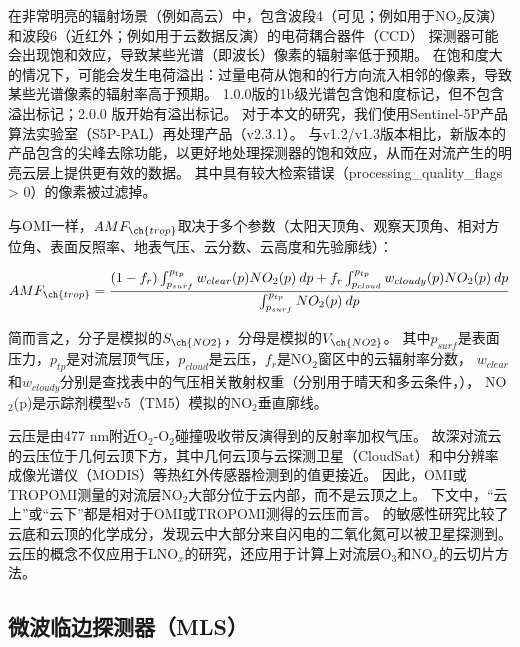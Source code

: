 在非常明亮的辐射场景（例如高云）中，包含波段4（可见；例如用于NO$_2$反演）和波段6（近红外；例如用于云数据反演）的电荷耦合器件（CCD） 探测器可能会出现饱和效应\citep{Ludewig.2020}，导致某些光谱（即波长）像素的辐射率低于预期。
在饱和度大的情况下，可能会发生电荷溢出：过量电荷从饱和的行方向流入相邻的像素，导致某些光谱像素的辐射率高于预期。
1.0.0版的1b级光谱包含饱和度标记，但不包含溢出标记；2.0.0 版开始有溢出标记\citep{Ludewig.2020}。
对于本文的研究，我们使用Sentinel-5P产品算法实验室（S5P-PAL）再处理产品（v2.3.1）。
与v1.2/v1.3版本相比，新版本的产品包含的尖峰去除功能，以更好地处理探测器的饱和效应，从而在对流产生的明亮云层上提供更有效的数据\citep{Ludewig.2020,VanGeffen.2022}。
其中具有较大检索错误（processing\_quality\_flags > 0）的像素被过滤掉。

与OMI一样，$AMF_{\ch{trop}}$取决于多个参数（太阳天顶角、观察天顶角、相对方位角、表面反照率、地表气压、云分数、云高度和先验廓线）：

\begin{equation} \label{eq:AMF_NO2}
AMF_{\ch{trop}} = \frac{(1-f_r) \int_{p_{surf}}^{p_{tp}} w_{clear}(p) NO_2(p) \: dp + f_r \int_{p_{cloud}}^{p_{tp}} w_{cloudy}(p) NO_2(p) \: dp}{\int_{p_{surf}}^{p_{tp}} NO_2(p) \: dp}
\end{equation}

简而言之，分子是模拟的$S_{\ch{NO2}}$，分母是模拟的$V_{\ch{NO2}}$。
其中$p_{surf}$是表面压力，$p_{tp}$是对流层顶气压，$p_{cloud}$是云压，$f_{r}$是NO$_2$窗区中的云辐射率分数，
$w_{clear}$和$w_{cloudy}$分别是查找表中的气压相关散射权重（分别用于晴天和多云条件，\citet{Lorente.2017}），
NO$_2$(p)是示踪剂模型v5（TM5）模拟的NO$_2$垂直廓线。

云压是由477 nm附近O$_2$-O$_2$碰撞吸收带反演得到的反射率加权气压\citep{Acarreta.2004,Sneep.2008,Stammes.2008}。
故深对流云的云压位于几何云顶下方，其中几何云顶与云探测卫星（CloudSat）和中分辨率成像光谱仪（MODIS）等热红外传感器检测到的值更接近\citep{Vasilkov.2008,Joiner.2012}。
因此，OMI或TROPOMI测量的对流层NO$_2$大部分位于云内部，而不是云顶之上。
下文中，“云上”或“云下”都是相对于OMI或TROPOMI测得的云压而言。
\citet{Beirle.2009}的敏感性研究比较了云底和云顶的化学成分，发现云中大部分来自闪电的二氧化氮可以被卫星探测到。
云压的概念不仅应用于LNO$_x$的研究，还应用于计算上对流层O$_3$和NO$_x$的云切片方法\citep{Ziemke.2009,Choi.2014,Strode.2017,Ziemke.2017,Marais.2018}。


\subsection{微波临边探测器（MLS）}

